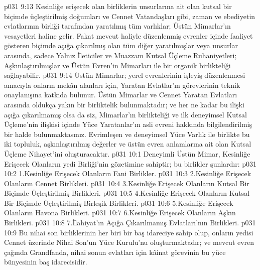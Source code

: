 \vs p031 9:13 Kesinliğe erişecek olan birliklerin unsurlarına ait olan kutsal bir biçimde üçleştirilmiş doğumları ve Cennet Vatandaşları gibi, zaman ve ebediyetin evlatlarının birliği tarafından yaratılmış tüm varlıklar; Üstün Mimarlar’ın vesayetleri haline gelir. Fakat mevcut haliyle düzenlenmiş evrenler içinde faaliyet gösteren biçimde açığa çıkarılmış olan tüm diğer yaratılmışlar veya unsurlar arasında, sadece Yalnız İleticiler ve Muazzam Kutsal Üçleme Ruhaniyetleri; Aşkınlaştırılmışlar ve Üstün Evren’in Mimarları ile bir organik birlikteliği sağlayabilir.
\vs p031 9:14 Üstün Mimarlar; yerel evrenlerinin işleyiş düzenlenmesi amacıyla onların mekân alanları için, Yaratan Evlatlar’ın görevlerinin teknik onaylanışına katkıda bulunur. Üstün Mimarlar ve Cennet Yaratan Evlatları arasında oldukça yakın bir birliktelik bulunmaktadır; ve her ne kadar bu ilişki açığa çıkarılmamış olsa da siz, Mimarlar’ın birlikteliği ve ilk deneyimsel Kutsal Üçleme’nin ilişkisi içinde Yüce Yaratanlar’ın asli evreni hakkında bilgilendirilmiş bir halde bulunmaktasınız. Evrimleşen ve deneyimsel Yüce Varlık ile birlikte bu iki topluluk, aşkınlaştırılmış değerler ve üstün evren anlamlarına ait olan Kutsal Üçleme Nihayet’ini oluşturacaktır.
\vs p031 10:1 Deneyimli Üstün Mimar, Kesinliğe Erişecek Olanların yedi Birliği’nin gözetimine sahiptir; bu birlikler şunlardır:
\vs p031 10:2 1.\bibnobreakspace Kesinliğe Erişecek Olanların Fani Birlikler.
\vs p031 10:3 2.\bibnobreakspace Kesinliğe Erişecek Olanların Cennet Birlikleri.
\vs p031 10:4 3.\bibnobreakspace Kesinliğe Erişecek Olanların Kutsal Bir Biçimde Üçleştirilmiş Birlikleri.
\vs p031 10:5 4.\bibnobreakspace Kesinliğe Erişecek Olanların Kutsal Bir Biçimde Üçleştirilmiş Birleşik Birlikleri.
\vs p031 10:6 5.\bibnobreakspace Kesinliğe Erişecek Olanların Havona Birlikleri.
\vs p031 10:7 6.\bibnobreakspace Kesinliğe Erişecek Olanların Aşkın Birlikleri.
\vs p031 10:8 7.\bibnobreakspace İlahiyat’ın Açığa Çıkarılmamış Evlatları’nın Birlikleri.
\vs p031 10:9 Bu nihai son birliklerinin her biri bir baş idareciye sahip olup, onların yedisi Cennet üzerinde Nihai Son’un Yüce Kurulu’nu oluşturmaktadır; ve mevcut evren çağında Grandfanda, nihai sonun evlatları için kâinat görevinin bu yüce bünyesinin baş idarecisidir.
